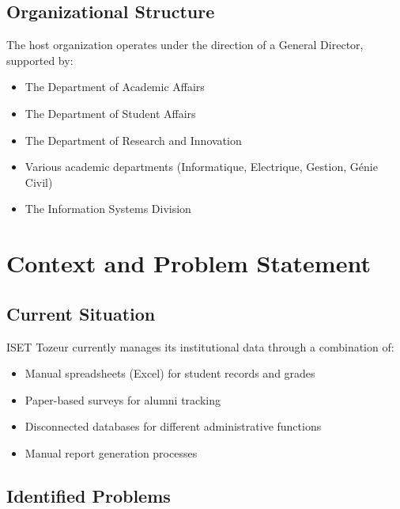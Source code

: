 \documentclass[12pt,a4paper]{report}
\begin{document}
\subsection{Organizational Structure}

The host organization operates under the direction of a General Director, supported by:
\begin{itemize}
    \item The Department of Academic Affairs
    \item The Department of Student Affairs
    \item The Department of Research and Innovation
    \item Various academic departments (Informatique, Electrique, Gestion, Génie Civil)
    \item The Information Systems Division
\end{itemize}

\section{Context and Problem Statement}

\subsection{Current Situation}

ISET Tozeur currently manages its institutional data through a combination of:
\begin{itemize}
    \item Manual spreadsheets (Excel) for student records and grades
    \item Paper-based surveys for alumni tracking
    \item Disconnected databases for different administrative functions
    \item Manual report generation processes
\end{itemize}

\subsection{Identified Problems}
\end{document}

